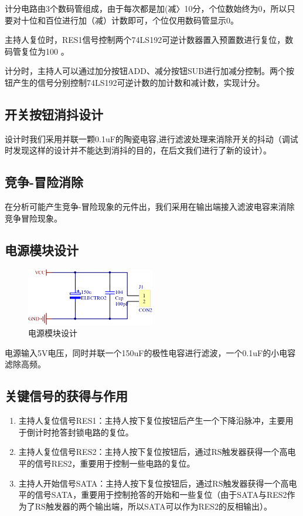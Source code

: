 \documentclass{../source/Experiment}
\begin{document}
        计分电路由3个数码管组成，由于每次都是加(减〉10分，个位数始终为0，所以只要对十位和百位进行加（减）计数即可，个位仅用数码管显示0。

        主持人复位时，RES1信号控制两个74LS192可逆计数器置入预置数进行复位，数码管复位为100 。

        计分时，主持人可以通过加分按钮ADD、减分按钮SUB进行加减分控制。两个按钮产生的信号分别控制74LS192可逆计数的加计数和减计数，实现计分。


        \subsection{开关按钮消抖设计}
        设计时我们采用并联一颗0.1uF的陶瓷电容,进行滤波处理来消除开关的抖动（调试时发现这样的设计并不能达到消抖的目的，在后文我们进行了新的设计）。
        \subsection{竞争-冒险消除}
        在分析可能产生竞争-冒险现象的元件出，我们采用在输出端接入滤波电容来消除竞争冒险现象。
        \subsection{电源模块设计}
                \begin{figure}[H]
                    \centering
                    \includegraphics[width = 0.5\textwidth]{pic/source.png}
                    \caption{电源模块设计}
                \end{figure}
            电源输入5V电压，同时并联一个150uF的极性电容进行滤波，一个0.1uF的小电容滤除高频。
        \subsection{关键信号的获得与作用}
            \begin{enumerate}
                \item 主持人复位信号RES1：主持人按下复位按钮后产生一个下降沿脉冲，主要用于倒计时抢答封锁电路的复位。
                \item 主持人复位信号RES2：主持人按下复位按钮后，通过RS触发器获得一个高电平的信号RES2，重要用于控制一些电路的复位。
                \item 主持人开始信号SATA：主持人按下复位按钮后，通过RS触发器获得一个高电平的信号SATA，重要用于控制抢答的开始和一些复位（由于SATA与RES2作为了RS触发器的两个输出端，所以SATA可以作为RES2的反相输出）。
            \end{enumerate}
\end{document}
